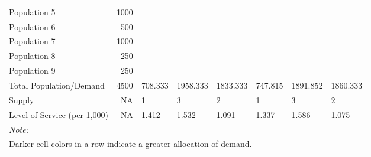 \documentclass[10pt,letterpaper]{article}
\begin{document}
\begin{landscape}
\begin{table}[t]
\begin{tabular}{lrllllll}
Population 5 & 1000 & \cellcolor[HTML]{FCA636}{\textcolor{black}{0}} & \cellcolor[HTML]{5601A4}{\textcolor{black}{500}} & \cellcolor[HTML]{5601A4}{\textcolor{black}{500}} & \cellcolor[HTML]{FCA636}{\textcolor{black}{0}} & \cellcolor[HTML]{8E0BA5}{\textcolor{black}{388.35}} & \cellcolor[HTML]{0D0887}{\textcolor{black}{611.65}}\\
\addlinespace
Population 6 & 500 & \cellcolor[HTML]{FCA636}{\textcolor{black}{0}} & \cellcolor[HTML]{7A02A8}{\textcolor{black}{250}} & \cellcolor[HTML]{7A02A8}{\textcolor{black}{250}} & \cellcolor[HTML]{FCA636}{\textcolor{black}{0}} & \cellcolor[HTML]{C6417D}{\textcolor{black}{143.71}} & \cellcolor[HTML]{0D0887}{\textcolor{black}{356.29}}\\
Population 7 & 1000 & \cellcolor[HTML]{FCA636}{\textcolor{black}{0}} & \cellcolor[HTML]{0D0887}{\textcolor{black}{500}} & \cellcolor[HTML]{0D0887}{\textcolor{black}{500}} & \cellcolor[HTML]{FCA636}{\textcolor{black}{0}} & \cellcolor[HTML]{0D0887}{\textcolor{black}{500}} & \cellcolor[HTML]{0D0887}{\textcolor{black}{500}}\\
Population 8 & 250 & \cellcolor[HTML]{FCA636}{\textcolor{black}{0}} & \cellcolor[HTML]{7A02A8}{\textcolor{black}{125}} & \cellcolor[HTML]{7A02A8}{\textcolor{black}{125}} & \cellcolor[HTML]{FCA636}{\textcolor{black}{0}} & \cellcolor[HTML]{0D0887}{\textcolor{black}{178.15}} & \cellcolor[HTML]{C6417D}{\textcolor{black}{71.853}}\\
Population 9 & 250 & \cellcolor[HTML]{FCA636}{\textcolor{black}{0}} & \cellcolor[HTML]{0D0887}{\textcolor{black}{125}} & \cellcolor[HTML]{0D0887}{\textcolor{black}{125}} & \cellcolor[HTML]{FCA636}{\textcolor{black}{0}} & \cellcolor[HTML]{0D0887}{\textcolor{black}{125}} & \cellcolor[HTML]{0D0887}{\textcolor{black}{125}}\\
Total Population/Demand & 4500 & 708.333 & 1958.333 & 1833.333 & 747.815 & 1891.852 & 1860.333\\
\addlinespace
Supply & NA & 1 & 3 & 2 & 1 & 3 & 2\\
Level of Service (per 1,000) & NA & 1.412 & 1.532 & 1.091 & 1.337 & 1.586 & 1.075\\
\bottomrule
\multicolumn{8}{l}{\textit{Note: }}\\
\multicolumn{8}{l}{Darker cell colors in a row indicate a greater allocation of demand. }\\
\end{tabular}
\end{table}
\end{landscape}
\end{document}
